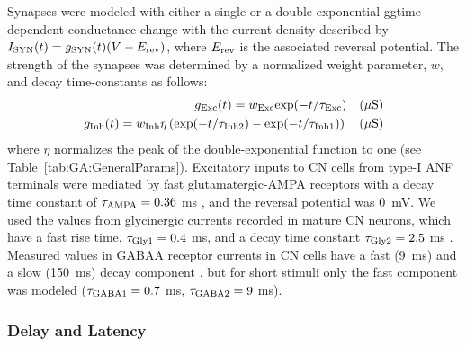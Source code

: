 Synapses were modeled with either a single or a double exponential
ggtime-dependent conductance change with the current density described
by $I_{{\rm SYN}} (t)=g_{{\rm SYN}} (t)(V-E_{{\rm rev}} )$, where
$E_{\rm rev}$ is the associated reversal potential. The strength of
the synapses was determined by a normalized weight parameter, $w$, and
decay time-constants as follows:
\begin{eqnarray}
  \label{eq:GA:11}
  g_{{\rm Exc}} (t)=w_{{\rm Exc}} {\rm exp}(-t/\tau _{{\rm Exc}} ) \quad (\mu\mathrm{S}) \\
  \label{eq:GA:12} g_{{\rm Inh}} (t)=w_{{\rm Inh}} \eta \left({\rm exp}(-t/\tau_{{\rm Inh2}} )-{\rm exp}(-t/\tau _{{\rm Inh1}} )\right) \quad (\mu\mathrm{S}) 
\end{eqnarray}
\noindent where $\eta$ normalizes the peak of the double-exponential
function to one (see Table~\ref{tab:GA:GeneralParams}). Excitatory inputs to CN cells
from type-I ANF terminals were mediated by fast glutamatergic-AMPA
receptors with a decay time constant of $\tau _{{\rm AMPA}} = 0.36$ ms
\citep{Gardner:2000,GardnerTrussellEtAl:1999}, and the reversal
potential was 0~mV. We used the values from glycinergic currents
recorded in mature CN neurons, which have a fast rise time, $\tau
_{{\rm Gly1}} = 0.4$ ms, and a decay time constant $\tau _{{\rm Gly2}}
= 2.5$ ms
\citep{AwatramaniTurecekEtAl:2005,HartyManis:1998,LeaoOleskevichEtAl:2004,LimOleskevichEtAl:2003}.
Measured values in GABAA receptor currents in CN cells have a fast
(9~ms) and a slow (150~ms) decay component
\citep{AwatramaniTurecekEtAl:2005,DavisYoung:2000}, but for short
stimuli only the fast component was modeled ($\tau _{{\rm GABA1}}
=0.7$ ms, $\tau _{{\rm GABA2}} =9$ ms).

\subsubsection{Delay and Latency}

